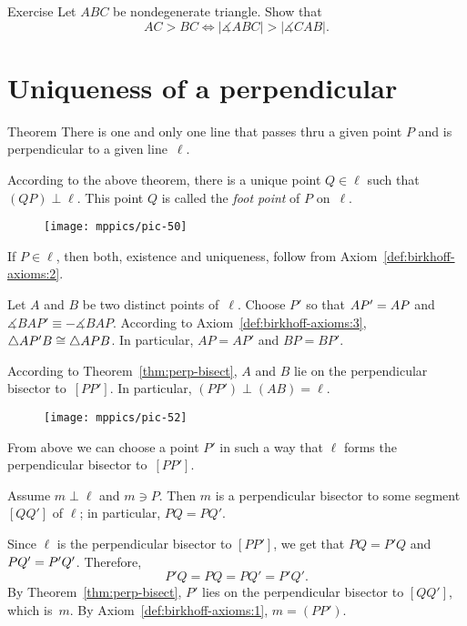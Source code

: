 \begin{thm}{Exercise}\label{ex:side-angle}
Let $ABC$ be nondegenerate triangle.
Show that 
\[AC>BC\iff|\measuredangle ABC|>|\measuredangle CAB|.\] 
\end{thm}



\section*{Uniqueness of a perpendicular}

\begin{thm}[\abs]{Theorem}\label{perp:ex+un}
There is one and only one line that passes thru a given point $P$ and is perpendicular to a given line~$\ell$.
\end{thm}

According to the above theorem, 
there is a unique point $Q\in\ell$ such that $(QP)\perp\ell$.
This point $Q$ is called the \emph{foot point} of $P$ on~$\ell$. 


{

\begin{wrapfigure}{o}{30mm}
\vskip-6mm
\centering
\texttt{[image: mppics/pic-50]}
\end{wrapfigure}

If $P\in\ell$, then both, existence and uniqueness, follow from Axiom~\ref{def:birkhoff-axioms:2}.

Let $A$ and $B$ be two distinct points of~$\ell$. 
Choose $P'$ so that $AP'\z=AP$ and $\measuredangle  BAP' \equiv -\measuredangle   BAP$.
According to Axiom~\ref{def:birkhoff-axioms:3}, $\triangle A P' B\z\cong\triangle A P B$.
In particular, $A P= A P'$ and $B P= B P'$.

}

According to Theorem~\ref{thm:perp-bisect}, $A$ and $B$ lie on the perpendicular bisector to~$[P P']$.
In particular, $(P P')\perp (A B)=\ell$.

{

\begin{wrapfigure}{r}{44mm}
\centering
\texttt{[image: mppics/pic-52]}
\end{wrapfigure}

From above we can choose a point $P'$ in such a way that $\ell$ forms the perpendicular bisector to~$[PP']$.

Assume $m\perp \ell$ and $m\ni P$.
Then $m$ is a perpendicular bisector to some segment $[Q Q']$ of $\ell$;
in particular, $P Q= P Q'$.

Since $\ell$ is the perpendicular bisector to $[P P']$,
we get that $PQ= P'Q$ and $PQ' \z= P'Q'$.
Therefore, 
$$P' Q=P Q=P Q'= P' Q'.$$
By Theorem~\ref{thm:perp-bisect}, 
$P'$ lies on the perpendicular bisector to $[QQ']$, which is~$m$.
By Axiom~\ref{def:birkhoff-axioms:1}, $m=(P P')$.
\qeds

}


